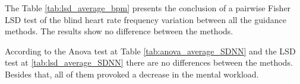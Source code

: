 

The Table \ref{tab:lsd_average_bpm} presents the conclusion of a pairwise Fisher LSD test of the blind heart rate frequency variation between all the guidance methods. The results show no difference between the methods.



%
%
%
%
%
%
%
%
%
%
%    
%
%

According to the Anova test at Table \ref{tab:anova_average_SDNN} and the LSD test at \ref{tab:lsd_average_SDNN} there are no differences between the methods. Besides that, all of them provoked a decrease in the mental workload.

\FloatBarrier